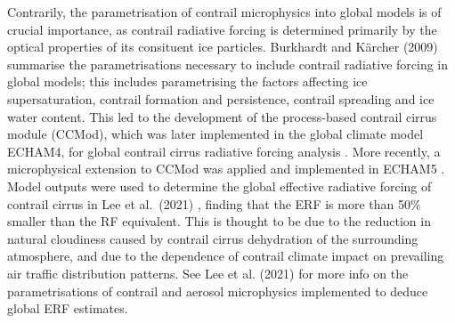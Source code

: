 Contrarily, the parametrisation of contrail microphysics into global models is of crucial importance, as contrail radiative forcing is determined primarily by the optical properties of its consituent ice particles. Burkhardt and K{\"a}rcher (2009) \cite{Burkhardt2009} summarise the parametrisations necessary to include contrail radiative forcing in global models; this includes parametrising the factors affecting ice supersaturation, contrail formation and persistence, contrail spreading and ice water content. This led to the development of the process-based contrail cirrus module (CCMod), which was later implemented in the global climate model ECHAM4, for global contrail cirrus radiative forcing analysis \cite{Burkhardt2010, Burkhardt2011, Lee2009}. More recently, a microphysical extension to CCMod was applied and implemented in ECHAM5 \cite{Bickel2020, Bock2016}. Model outputs were used to determine the global effective radiative forcing of contrail cirrus in Lee et al.\ (2021) \cite{Lee2021}, finding that the ERF is more than 50\% smaller than the RF equivalent. This is thought to be due to the reduction in natural cloudiness caused by contrail cirrus dehydration of the surrounding atmosphere, and due to the dependence of contrail climate impact on prevailing air traffic distribution patterns. See Lee et al. (2021) \cite{Lee2021} for more info on the parametrisations of contrail and aerosol microphysics implemented to deduce global ERF estimates.






